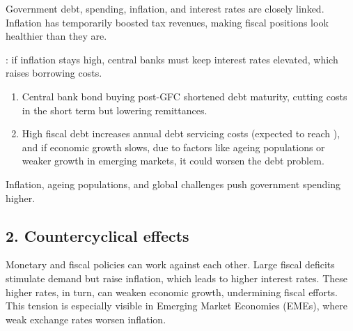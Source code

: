 Government debt, spending, inflation, and interest rates are closely linked. Inflation has
temporarily boosted tax revenues, making fiscal positions look healthier than they are.

: if inflation stays high, central banks must keep
interest rates elevated, which raises borrowing costs.

\begin{enumerate}[label=\textbf{\alph*)}]
\item Central bank bond buying post-GFC shortened debt maturity, cutting costs in the short
term but lowering remittances.
\item High fiscal debt increases annual debt servicing costs (expected to reach ), and if economic growth slows, due to factors like ageing populations or weaker growth
in emerging markets, it could worsen the debt problem.
\end{enumerate}

 Inflation, ageing populations, and global
challenges push government spending higher.

\subsection*{2. Countercyclical effects}

Monetary and fiscal policies can work against each other. Large fiscal deficits stimulate
demand but raise inflation, which leads to higher interest rates. These higher rates, in turn,
can weaken economic growth, undermining fiscal efforts. This tension is especially visible in
Emerging Market Economies (EMEs), where weak exchange rates worsen inflation.

